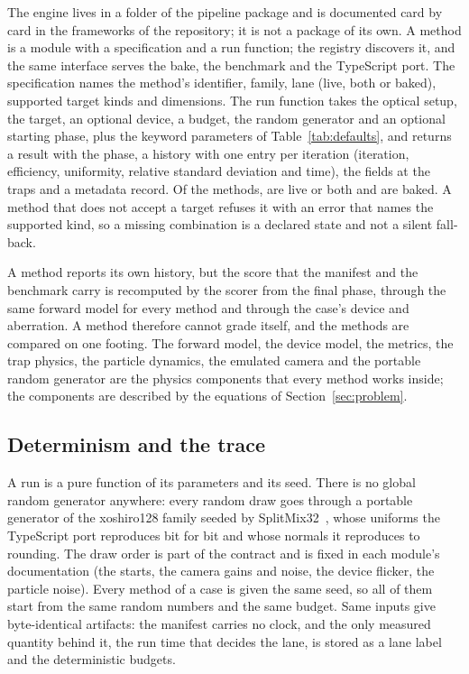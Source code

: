 The engine lives in a folder of the pipeline package and is documented card by card in the frameworks of the repository; it is not a package of its own. A method is a module with a specification and a run function; the registry discovers it, and the same interface serves the bake, the benchmark and the TypeScript port. The specification names the method's identifier, family, lane (live, both or baked), supported target kinds and dimensions. The run function takes the optical setup, the target, an optional device, a budget, the random generator and an optional starting phase, plus the keyword parameters of Table~\ref{tab:defaults}, and returns a result with the phase, a history with one entry per iteration (iteration, efficiency, uniformity, relative standard deviation and time), the fields at the traps and a metadata record. Of the \nLadder{} methods, \nLiveMethods{} are live or both and \nBakedMethods{} are baked. A method that does not accept a target refuses it with an error that names the supported kind, so a missing combination is a declared state and not a silent fall-back.



A method reports its own history, but the score that the manifest and the benchmark carry is recomputed by the scorer from the final phase, through the same forward model for every method and through the case's device and aberration. A method therefore cannot grade itself, and the methods are compared on one footing. The forward model, the device model, the metrics, the trap physics, the particle dynamics, the emulated camera and the portable random generator are the physics components that every method works inside; the components are described by the equations of Section~\ref{sec:problem}.

\subsection{Determinism and the trace}\label{sec:arch-determinism}

A run is a pure function of its parameters and its seed. There is no global random generator anywhere: every random draw goes through a portable generator of the xoshiro128 family seeded by SplitMix32~\cite{blackman}, whose uniforms the TypeScript port reproduces bit for bit and whose normals it reproduces to rounding. The draw order is part of the contract and is fixed in each module's documentation (the starts, the camera gains and noise, the device flicker, the particle noise). Every method of a case is given the same seed, so all of them start from the same random numbers and the same budget. Same inputs give byte-identical artifacts: the manifest carries no clock, and the only measured quantity behind it, the run time that decides the lane, is stored as a lane label and the deterministic budgets.

